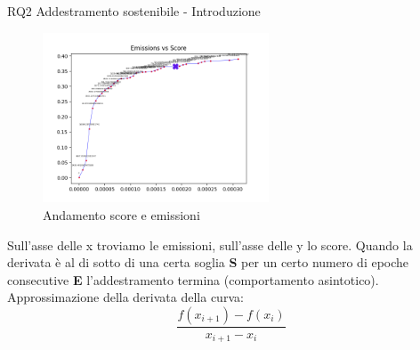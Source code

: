 \begin{frame}{RQ2 Addestramento sostenibile - Introduzione}
    \begin{figure}
        \centering
        \includegraphics[width=0.6\textwidth, height=0.6\textheight]{images/curve_emissions_score.png}
        \caption{Andamento score e emissioni}
    \end{figure} 
Sull'asse delle x troviamo le emissioni, sull'asse delle y lo score. Quando la derivata è al di sotto di una certa soglia \textbf{S} per un certo numero di epoche consecutive \textbf{E} l'addestramento termina (comportamento asintotico).
Approssimazione della derivata della curva:
\begin{equation*}
    \frac{f(x_{i+1}) - f(x_i)}{x_{i+1} - x_i}
\end{equation*}
\end{frame}



